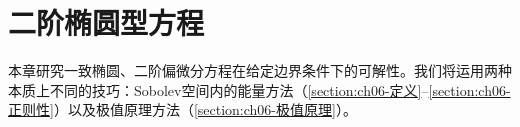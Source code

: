 \documentclass[../main.tex]{subfiles}
\begin{document}
\chapter{二阶椭圆型方程}\label{chapter:ch06-二阶椭圆型方程}

本章研究一致椭圆、二阶偏微分方程在给定边界条件下的可解性。我们将运用两种本质上不同的技巧：Sobolev空间内的能量方法（\cref{section:ch06-定义}--\cref{section:ch06-正则性}）以及极值原理方法（\cref{section:ch06-极值原理}）。








\end{document}
